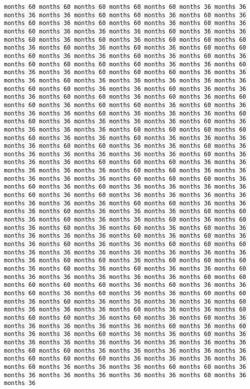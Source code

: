 \documentclass[11pt]{article}
\begin{document}
\begin{Verbatim}[commandchars=\\\{\}, frame=single, framerule=2mm, rulecolor=\color{outerrorbackground}]
months 60 months 60 months 60 months 60 months 60 months 36 months 36 months 36 months 36 months 60 months 60 months 36 months 60 months 36 months 60 months 36 months 60 months 60 months 36 months 60 months 36 months 60 months 36 months 36 months 36 months 60 months 36 months 36 months 60 months 36 months 60 months 36 months 60 months 60 months 60 months 36 months 60 months 36 months 60 months 36 months 60 months 60 months 60 months 36 months 36 months 60 months 36 months 60 months 36 months 60 months 60 months 60 months 60 months 36 months 36 months 60 months 36 months 36 months 60 months 60 months 60 months 36 months 36 months 36 months 60 months 36 months 36 months 36 months 36 months 36 months 60 months 60 months 36 months 36 months 60 months 36 months 36 months 36 months 60 months 60 months 36 months 60 months 36 months 60 months 60 months 36 months 60 months 60 months 36 months 60 months 36 months 36 months 36 months 60 months 36 months 36 months 36 months 60 months 60 months 36 months 36 months 36 months 36 months 60 months 36 months 36 months 36 months 36 months 60 months 60 months 60 months 60 months 60 months 36 months 36 months 60 months 36 months 36 months 36 months 36 months 60 months 60 months 36 months 36 months 60 months 36 months 36 months 36 months 36 months 36 months 36 months 60 months 36 months 36 months 36 months 60 months 60 months 60 months 36 months 36 months 36 months 36 months 36 months 60 months 60 months 36 months 36 months 36 months 36 months 36 months 60 months 60 months 60 months 36 months 60 months 36 months 60 months 36 months 36 months 36 months 36 months 60 months 36 months 60 months 36 months 36 months 36 months 36 months 36 months 36 months 36 months 60 months 60 months 36 months 36 months 36 months 60 months 36 months 36 months 36 months 60 months 60 months 36 months 60 months 36 months 36 months 60 months 36 months 60 months 36 months 60 months 36 months 60 months 36 months 60 months 36 months 36 months 36 months 36 months 60 months 36 months 60 months 36 months 36 months 60 months 36 months 36 months 60 months 60 months 60 months 36 months 36 months 36 months 36 months 36 months 36 months 36 months 36 months 60 months 60 months 36 months 60 months 60 months 60 months 36 months 60 months 36 months 60 months 36 months 36 months 60 months 36 months 36 months 36 months 36 months 36 months 60 months 60 months 60 months 60 months 60 months 36 months 60 months 36 months 36 months 60 months 36 months 60 months 36 months 36 months 60 months 60 months 36 months 60 months 36 months 36 months 36 months 36 months 60 months 36 months 36 months 36 months 60 months 36 months 36 months 60 months 60 months 60 months 36 months 60 months 36 months 60 months 36 months 36 months 36 months 36 months 36 months 60 months 36 months 60 months 36 months 36 months 60 months 36 months 36 months 60 months 36 months 36 months 36 months 36 months 36 months 36 months 36 months 36 months 60 months 60 months 36 months 36 months 36 months 36 months 36 months 60 months 60 months 60 months 36 months 36 months 36 months 36 months 60 months 36 months 36 months 36 months 60 months 60 months 36 months 36 months 36 months 36 months 36 months 36 months 60 months 36 months 36 
\end{Verbatim}
\end{document}
